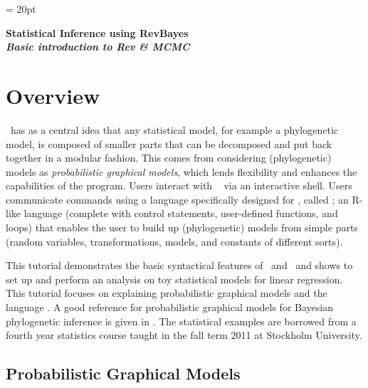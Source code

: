 \documentclass[11pt]{article}
\begin{document}
\renewcommand{\headrulewidth}{0.5pt}
\headsep = 20pt
\lhead{ }

\thispagestyle{plain}
\begin{center}

\textbf{\LARGE Statistical Inference using RevBayes}\\\vspace{2mm}
\textbf{\it{\Large Basic introduction to Rev \& MCMC}}\\\vspace{2mm}
\end{center}

\section*{Overview}

\RevBayes~has as a central idea that any statistical model, for example a phylogenetic model, is composed of smaller parts that can be decomposed and put back together in a modular fashion. This comes from considering (phylogenetic) models as \textit{probabilistic graphical models}, which lends flexibility and enhances the capabilities of the program. 
Users interact with \RevBayes~ via an interactive shell.
Users communicate commands using a language specifically designed for \RevBayes, called \Rev; an R-like language (complete with control statements, user-defined functions, and loops) that enables the user to build up (phylogenetic) models from simple parts (random variables, transformations, models, and constants of different sorts).
 

This tutorial demonstrates the basic syntactical features of \RevBayes~and \Rev~and shows to set up and perform an analysis on toy statistical models for linear regression. 
This tutorial focuses on explaining probabilistic graphical models and the language \Rev.
A good reference for probabilistic graphical models for Bayesian phylogenetic inference is given in  \citep{hoehnaGM2014}.
The statistical examples are borrowed from a fourth year statistics course taught in the fall term 2011 at Stockholm University.


\bigskip
\subsection*{Probabilistic Graphical Models}
\end{document}
